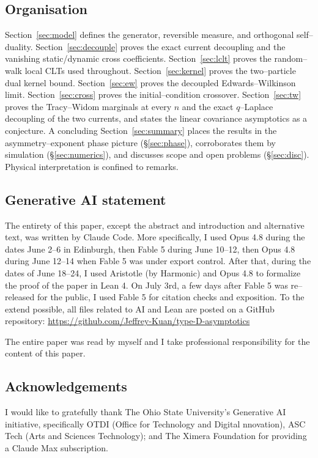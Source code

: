 \documentclass[11pt]{article}
\theoremstyle{plain}
\theoremstyle{definition}
\theoremstyle{remark}
\begin{document}
\subsection{Organisation}\label{sec:introorg}
Section~\ref{sec:model} defines the generator, reversible measure, and orthogonal
self--duality. Section~\ref{sec:decouple} proves the exact current decoupling and the
vanishing static/dynamic cross coefficients. Section~\ref{sec:lclt} proves the
random--walk local CLTs used throughout. Section~\ref{sec:kernel} proves the
two--particle dual kernel bound. Section~\ref{sec:ew} proves the decoupled
Edwards--Wilkinson limit. Section~\ref{sec:cross} proves the initial--condition
crossover. Section~\ref{sec:tw} proves the Tracy--Widom marginals at every $n$ and
the exact $q$--Laplace decoupling of the two currents, and states the linear
covariance asymptotics as a conjecture. A concluding Section~\ref{sec:summary} places the
results in the asymmetry--exponent phase picture (\S\ref{sec:phase}), corroborates them
by simulation (\S\ref{sec:numerics}), and discusses scope and open problems
(\S\ref{sec:disc}). Physical interpretation is confined to remarks.

\subsection{Generative AI statement}
The entirety of this paper, except the abstract and introduction and alternative text, was written by Claude Code. More specifically, I used Opus 4.8 during the dates June 2--6 in Edinburgh, then Fable 5 during June 10--12, then Opus 4.8 during June 12--14 when Fable 5 was under export control. After that, during the dates of June 18--24, I used Aristotle (by Harmonic) and Opus 4.8 to formalize the proof of the paper in Lean 4. On July 3rd, a few days after Fable 5 was re--released for the public, I used Fable 5 for citation checks and exposition. To the extend possible, all files related to AI and Lean are posted on a GitHub repository: \url{https://github.com/Jeffrey-Kuan/type-D-asymptotics}

The entire paper was read by myself and I take professional responsibility for the content of this paper. 

\subsection{Acknowledgements}

I would like to gratefully thank The Ohio State University's Generative AI initiative, specifically OTDI (Office for Technology and Digital nnovation), ASC Tech (Arts and Sciences Technology); and The Ximera Foundation for providing a Claude Max subscription.
\end{document}

